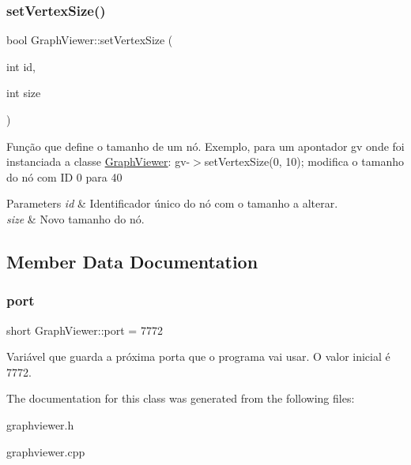 \subsubsection{\texorpdfstring{set\+Vertex\+Size()}{setVertexSize()}}
{\footnotesize\ttfamily bool Graph\+Viewer\+::set\+Vertex\+Size (\begin{DoxyParamCaption}\item[{int}]{id,  }\item[{int}]{size }\end{DoxyParamCaption})}

Função que define o tamanho de um nó. Exemplo, para um apontador gv onde foi instanciada a classe \hyperlink{class_graph_viewer}{Graph\+Viewer}\+: gv-\/$>$set\+Vertex\+Size(0, 10); modifica o tamanho do nó com ID 0 para 40


\begin{DoxyParams}{Parameters}
{\em id} & Identificador único do nó com o tamanho a alterar. \\
\hline
{\em size} & Novo tamanho do nó. \\
\hline
\end{DoxyParams}


\subsection{Member Data Documentation}
\hypertarget{class_graph_viewer_a89d0abe75f41feededc49497cc514342}{}\label{class_graph_viewer_a89d0abe75f41feededc49497cc514342} 
\subsubsection{\texorpdfstring{port}{port}}
{\footnotesize\ttfamily short Graph\+Viewer\+::port = 7772\hspace{0.3cm}{\ttfamily [static]}}

Variável que guarda a próxima porta que o programa vai usar. O valor inicial é 7772. 

The documentation for this class was generated from the following files\+:\begin{DoxyCompactItemize}
\item 
graphviewer.\+h\item 
graphviewer.\+cpp\end{DoxyCompactItemize}
